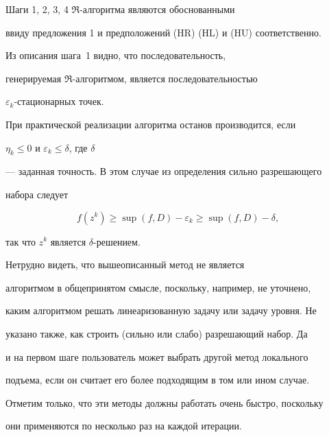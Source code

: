 \begin{note}


Шаги 1, 2, 3, 4 $\Re$-алгоритма являются обоснованными


ввиду предложения 1 и предположений (HR) (HL) и (HU) соответственно.


\end{note}


 


\begin{note}


Из описания шага~1 видно, что последовательность,


генерируемая $\Re$-ал\-го\-рит\-мом, является последовательностью 


$\varepsilon_{k}$-стационарных точек.


\end{note}





\begin{note}


При практической реализации алгоритма останов производится, если


$\eta_{k}\leq 0 $ и $\varepsilon_{k} \leq \delta $, где $\delta$ 


--- заданная точность. В этом случае из определения сильно разрешающего


набора следует


$$


f(z^{k}) \geq \sup(f,D) - \varepsilon_{k} \geq \sup(f,D)- \delta,


$$


так что $z^{k}$ является $\delta$-решением.


\end{note}





\begin{note}


Нетрудно видеть, что вышеописанный метод не является


алгоритмом в общепринятом смысле, поскольку, например, не уточнено, 


каким алгоритмом решать линеаризованную задачу или задачу уровня. Не


указано также, как строить (сильно или слабо) разрешающий набор. Да


и на первом шаге пользователь может выбрать другой метод локального 


подъема, если он считает его более подходящим в том или ином случае. 


Отметим только, что эти методы должны работать очень быстро, поскольку


они применяются по несколько раз на каждой итерации.


\end{note}





